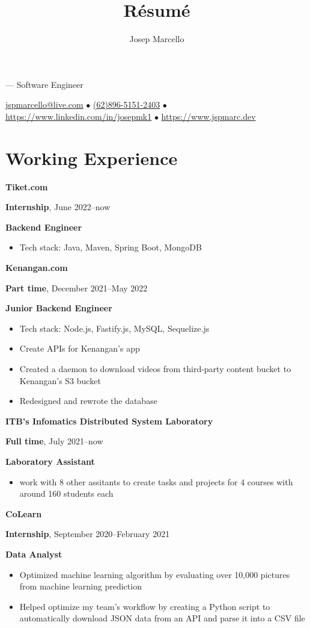 \documentclass[10pt]{article}
\makeatletter
\renewcommand{\maketitle}{
    \rmfamily
    {\huge \theauthor} ---
    \sffamily
    Software Engineer

    \vspace{0.1em}
    \href{mailto:jspmarcello@live.com}{jspmarcello@live.com} $\bullet$
    \href{https://wa.me/6289651512403}{(62)896-5151-2403} $\bullet$
    \href{https://www.linkedin.com/in/josepmk1}{https://www.linkedin.com/in/josepmk1} $\bullet$
    \href{https://www.jspmarc.dev}{https://www.jspmarc.dev}
}
\newcommand{\workExpVspace}{0.2em}
\newcommand{\workExp}[6]{
    \noindent \textbf{#1}

    \textbf{#2}, #3--#4

    \textbf{#5}

    {#6}
    \vspace{\workExpVspace}
}
\makeatother
\begin{document}
\title{R\'esum\'e}
\author{Josep Marcello}

\maketitle

\section{Working Experience}
\workExp
    {Tiket.com}
    {Internship}
    {June 2022}
    {now}
    {Backend Engineer}
    {
        \begin{itemize}
            \item Tech stack: Java, Maven, Spring Boot, MongoDB
        \end{itemize}
    }

\workExp
    {Kenangan.com}
    {Part time}
    {December 2021}
    {May 2022}
    {Junior Backend Engineer}
    {
        \begin{itemize}
            \item Tech stack: Node.js, Fastify.js, MySQL, Sequelize.js
            \item Create APIs for Kenangan's app
            \item Created a daemon to download videos from third-party content bucket to Kenangan's
                S3 bucket
            \item Redesigned and rewrote the database
        \end{itemize}
    }

\workExp
    {ITB's Infomatics Distributed System Laboratory}
    {Full time}
    {July 2021}
    {now}
    {Laboratory Assistant}
    {
        \begin{itemize}
            \item work with 8 other assitants to create tasks and projects for 4 courses with
                around 160 students each
        \end{itemize}
    }

\workExp
    {CoLearn}
    {Internship}
    {September 2020}
    {February 2021}
    {Data Analyst}
    {
        \begin{itemize}
            \item Optimized machine learning algorithm by evaluating over 10,000 pictures from
                machine learning prediction
            \item Helped optimize my team's workflow by creating a Python script to automatically
                download JSON data from an API and parse it into a CSV file
        \end{itemize}
    }
\end{document}
